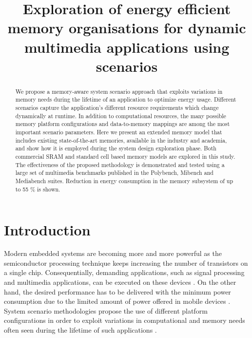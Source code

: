 \documentclass[a4paper,conference]{IEEEtran}
\begin{document}
\title{Exploration of energy efficient memory organisations for dynamic multimedia applications using scenarios}
\author{
}

\maketitle

\begin{abstract}
We propose a memory-aware system scenario approach that exploits variations in memory needs during the lifetime of an application to optimize energy usage. Different scenarios capture the application’s different resource requirements which change dynamically at runtime. In addition to computational resources, the many possible memory platform configurations and data-to-memory mappings are among the most important scenario parameters. Here we present an extended memory model that includes existing state-of-the-art memories, available in the industry and academia, and show how it is employed during the system design exploration phase. Both commercial SRAM and standard cell based memory models are explored in this study. The effectiveness of the proposed methodology is demonstrated and tested using a large set of multimedia benchmarks published in the Polybench, Mibench and Mediabench suites. Reduction in energy consumption in the memory subsystem of up to 55 \% is shown.
\end{abstract}
\IEEEpeerreviewmaketitle

\section{Introduction}
\label{sec:introduction}

Modern embedded systems are becoming more and more powerful as the semiconductor processing technique keeps increasing the number of transistors on a single chip. Consequentially, demanding applications, such as signal processing and multimedia applications, can be executed on these devices \cite{narasinga}. On the other hand, the desired performance has to be delivered with the minimum power consumption due to the limited amount of power offered in mobile devices \cite{tcm}. System scenario methodologies propose the use of different platform configurations in order to exploit variations in computational and memory needs often seen during the lifetime of such applications \cite{tcm}. 
\end{document}
